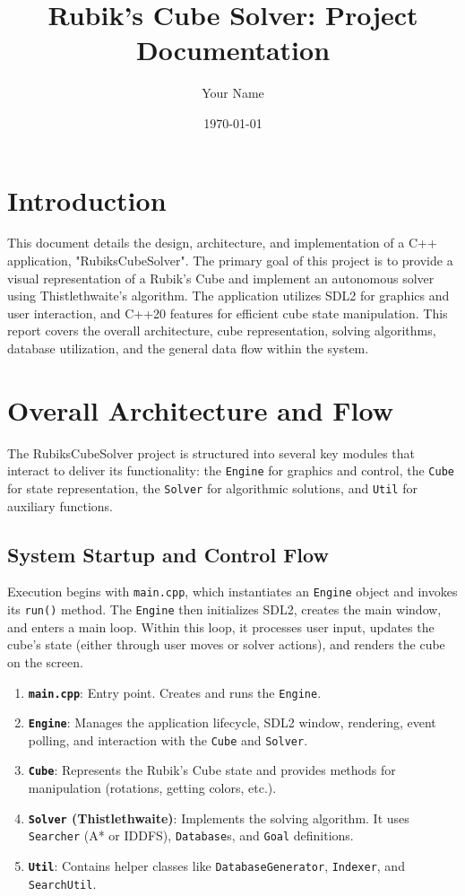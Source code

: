 \documentclass[11pt, a4paper]{article}
\title{Rubik's Cube Solver: Project Documentation}
\author{Your Name} %
\date{\today}
\begin{document}
\maketitle
\thispagestyle{empty}
\newpage

\tableofcontents
\thispagestyle{empty}
\newpage
\setcounter{page}{1}

\section{Introduction}
This document details the design, architecture, and implementation of a C++ application, "RubiksCubeSolver". The primary goal of this project is to provide a visual representation of a Rubik's Cube and implement an autonomous solver using Thistlethwaite's algorithm. The application utilizes SDL2 for graphics and user interaction, and C++20 features for efficient cube state manipulation. This report covers the overall architecture, cube representation, solving algorithms, database utilization, and the general data flow within the system.

\section{Overall Architecture and Flow}
The RubiksCubeSolver project is structured into several key modules that interact to deliver its functionality: the \texttt{Engine} for graphics and control, the \texttt{Cube} for state representation, the \texttt{Solver} for algorithmic solutions, and \texttt{Util} for auxiliary functions.

\subsection{System Startup and Control Flow}
Execution begins with \texttt{main.cpp}, which instantiates an \texttt{Engine} object and invokes its \texttt{run()} method. The \texttt{Engine} then initializes SDL2, creates the main window, and enters a main loop. Within this loop, it processes user input, updates the cube's state (either through user moves or solver actions), and renders the cube on the screen.

\begin{enumerate}
    \item \textbf{\texttt{main.cpp}}: Entry point. Creates and runs the \texttt{Engine}.
    \item \textbf{\texttt{Engine}}: Manages the application lifecycle, SDL2 window, rendering, event polling, and interaction with the \texttt{Cube} and \texttt{Solver}.
    \item \textbf{\texttt{Cube}}: Represents the Rubik's Cube state and provides methods for manipulation (rotations, getting colors, etc.).
    \item \textbf{\texttt{Solver} (Thistlethwaite)}: Implements the solving algorithm. It uses \texttt{Searcher} (A* or IDDFS), \texttt{Database}s, and \texttt{Goal} definitions.
    \item \textbf{\texttt{Util}}: Contains helper classes like \texttt{DatabaseGenerator}, \texttt{Indexer}, and \texttt{SearchUtil}.
\end{enumerate}
\end{document}
